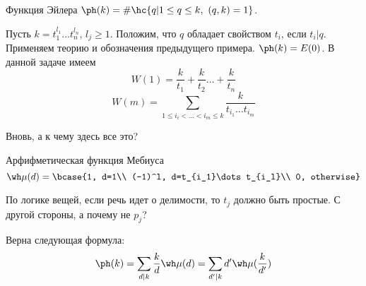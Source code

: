 \documentclass[unicode, 10pt, a4paper, oneside, fleqn]{article}
\begin{document}
\begin{ex}
  \begin{df}
    Функция Эйлера $\ph(k) =\#\hc{q|1\le q\le k,\ (q,k) = 1}$.
  \end{df}
  Пусть $k=t_1^{l_1}\dots t_n^{l_n}$, $l_j\ge 1$. Положим, что $q$ обладает свойством $t_i$, если $t_i|q$.
  Применяем теорию и обозначения предыдущего примера. $\ph(k)=E(0)$. В данной задаче имеем
  \begin{displaymath}
    W(1) = \frac{k}{t_1}+\frac{k}{t_2}\dots +\frac{k}{t_n}
  \end{displaymath}
  \begin{displaymath}
    W(m)=\sum_{1\le i_i<\dots <i_m\le k}\frac{k}{t_{i_1}\dots t_{i_m}}
  \end{displaymath}
  \begin{authornote}
    Вновь, а к чему здесь все это?
  \end{authornote}
  \begin{df}
    Арфифметическая функция Мебиуса
    \begin{displaymath}
      \wh \mu(d)=\bcase{1, d=1\\ (-1)^l, d=t_{i_1}\dots t_{i_l}\\ 0, otherwise}
    \end{displaymath}
    \begin{authornote}
      По логике вещей, если речь идет о делимости, то $t_j$ должно быть простые. С другой стороны, 
      а почему не $p_j$?
    \end{authornote}
  \end{df}
  Верна следующая формула\WHY: 
  \begin{displaymath}
    \displaystyle \ph(k)=\sum_{d|k}\frac{k}{d}\wh\mu(d)=\sum_{d'|k}d'\wh\mu(\frac{k}{d'})
  \end{displaymath}
  

\end{ex}
\end{document}
